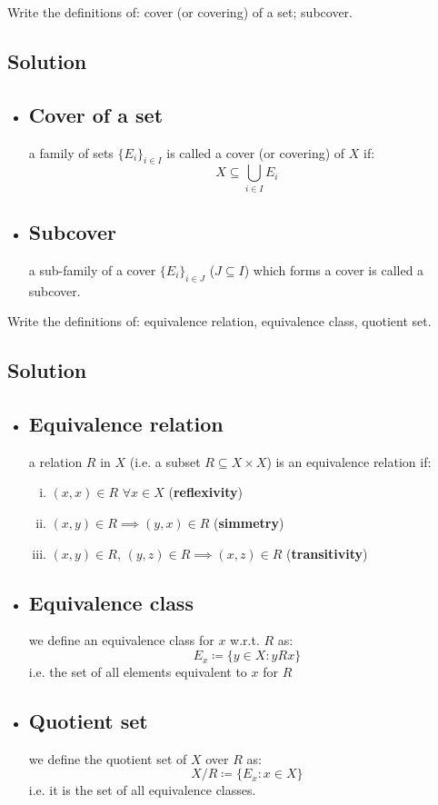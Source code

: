 
\question
Write the definitions of: cover (or covering) of a set; subcover.

\subsection*{Solution}
\provdefs
\begin{itemize}
    \item \subsection{Cover of a set} a family of sets $\{E_i\}_{i\in I}$ is called a cover (or covering) of $X$ if:
    \[
        X \subseteq \bigcup_{i\in I} E_i    
    \]
    \item \subsection{Subcover} a sub-family of a cover $\{E_i\}_{i\in J}$ ($J\subseteq I$) which forms a cover is called a subcover.  
\end{itemize}


\question
Write the definitions of: equivalence relation, equivalence class, quotient set.

\subsection*{Solution}
\provdefs
\begin{itemize}
    \item \subsection{Equivalence relation} a relation $R$ in $X$ (i.e. a subset $R\subseteq X\times X$) is an equivalence relation if:
    \begin{enumerate}[i)]
        \item $(x,x) \in R$ $\forall x\in X$ (\textbf{reflexivity})
        \item $(x,y) \in R \implies (y,x)\in R$ (\textbf{simmetry})
        \item $(x,y) \in R, \, (y,z)\in R \implies (x,z)\in R$ (\textbf{transitivity})
    \end{enumerate}
    \item \subsection{Equivalence class} we define an equivalence class for $x$ w.r.t. $R$ as:
    \[
        E_x \coloneqq \{y\in X : yRx\}
    \]
    i.e. the set of all elements equivalent to $x$ for $R$
    \item \subsection{Quotient set} we define the quotient set of $X$ over $R$ as:
    \[
        X / R \coloneqq \{E_x: x\in X \}    
    \]
    i.e. it is the set of all equivalence classes.
\end{itemize}

